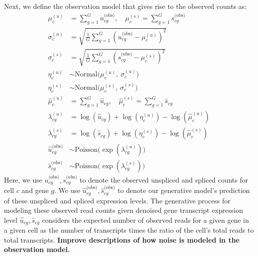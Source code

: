 \documentclass[
  sn-mathphys-num,
  lineno,
  twocolumn]{sn-jnl}
\begin{document}
Next, we define the observation model that gives rise to the observed
counts as: \begin{align}
  \mu^{(u)}_c &= \sum_{g=1}^G {u}^{\text{(obs)}}_{cg}, \quad \mu^{(s)}_c = \sum_{g=1}^G {s}^{\text{(obs)}}_{cg} \\
  \sigma^{(u)}_c &= \sqrt{\frac{1}{G} \sum_{g=1}^G \left( u_{cg}^{\text{(obs)}} - \mu^{(u)}_c \right)^2} \\
  \sigma^{(s)}_c &= \sqrt{\frac{1}{G} \sum_{g=1}^G \left( s_{cg}^{\text{(obs)}} - \mu^{(s)}_c \right)^2} \\
  \eta^{(u)}_c &\sim \text{Normal}\Big(\mu^{(u)}_c, \ \sigma^{(u)}_c\Big) \\
  \eta^{(s)}_c &\sim \text{Normal}\Big(\mu^{(s)}_c, \ \sigma^{(s)}_c\Big) \\
  \hat{\mu}^{(u)}_c &= \sum_{g=1}^G \hat{u}_{cg}, \quad \hat{\mu}^{(s)}_c = \sum_{g=1}^G \hat{s}_{cg} \\
  \lambda^{(u)}_{cg} &= \log(\hat{u}_{cg}) + \log(\eta^{(u)}_{c}) - \log(\hat{\mu}^{(u)}_c) \\
  \lambda^{(s)}_{cg} &= \log(\hat{s}_{cg}) + \log(\eta^{(s)}_{c}) - \log(\hat{\mu}^{(s)}_c) \\
  \hat{u}^{\text{(obs)}}_{cg} &\sim \text{Poisson}\Big(\exp (\lambda^{(u)}_{cg})\Big) \\
  \hat{s}^{\text{(obs)}}_{cg} &\sim \text{Poisson}\Big(\exp (\lambda^{(s)}_{cg})\Big)
\end{align} Here, we use
\({u}^{\text{(obs)}}_{cg}, {s}^{\text{(obs)}}_{cg}\) to denote the
observed unspliced and spliced counts for cell \(c\) and gene \(g\). We
use \(\hat{u}^{\text{(obs)}}_{cg}, \hat{s}^{\text{(obs)}}_{cg}\) to
denote our generative model's prediction of these unspliced and spliced
expression levels. The generative process for modeling these observed
read counts given denoised gene transcript expression level
\(\hat{u}_{cg}, \hat{s}_{cg}\) considers the expected number of observed
reads for a given gene in a given cell as the number of transcripts
times the ratio of the cell's total reads to total transcripts.
\textbf{Improve descriptions of how noise is modeled in the observation model.}
\end{document}
